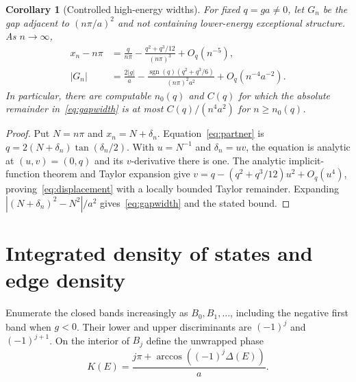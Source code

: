 \documentclass[10pt]{article}
\newtheorem{corollary}[theorem]{Corollary}
\begin{document}
\begin{corollary}[Controlled high-energy widths]\label{cor:width}
For fixed $q=ga\ne0$, let $G_n$ be the gap adjacent to $(n\pi/a)^2$ and
not containing lower-energy exceptional structure.  As $n\to\infty$,
\begin{align}
 x_n-n\pi
 &=\frac{q}{n\pi}-\frac{q^2+q^3/12}{(n\pi)^3}
      +O_q(n^{-5}),\label{eq:displacement}\\
 |G_n|
 &=\frac{2|g|}{a}
 -\frac{\operatorname{sgn}(q)(q^2+q^3/6)}{(n\pi)^2a^2}
      +O_q(n^{-4}a^{-2}).\label{eq:gapwidth}
\end{align}
In particular, there are computable $n_0(q)$ and $C(q)$ for which the
absolute remainder in~\eqref{eq:gapwidth} is at most
$C(q)/(n^4a^2)$ for $n\geq n_0(q)$.
\end{corollary}
\begin{proof}
Put $N=n\pi$ and $x_n=N+\delta_n$.  Equation~\eqref{eq:partner} is
$q=2(N+\delta_n)\tan(\delta_n/2)$.  With $u=N^{-1}$ and
$\delta_n=u v$, the equation is analytic at $(u,v)=(0,q)$ and its
$v$-derivative there is one.  The analytic implicit-function theorem and
Taylor expansion give
$v=q-(q^2+q^3/12)u^2+O_q(u^4)$, proving~\eqref{eq:displacement} with a
locally bounded Taylor remainder.  Expanding
$|(N+\delta_n)^2-N^2|/a^2$ gives~\eqref{eq:gapwidth} and the stated bound.
\end{proof}

\section{Integrated density of states and edge density}
Enumerate the closed bands increasingly as $B_0,B_1,\ldots$, including the
negative first band when $g<0$.  Their lower and upper discriminants are
$(-1)^j$ and $(-1)^{j+1}$.  On the interior of $B_j$ define the unwrapped
phase
\begin{equation}\label{eq:phase}
 K(E)=\frac{j\pi+\arccos((-1)^j\Delta(E))}{a}.
\end{equation}
\end{document}
